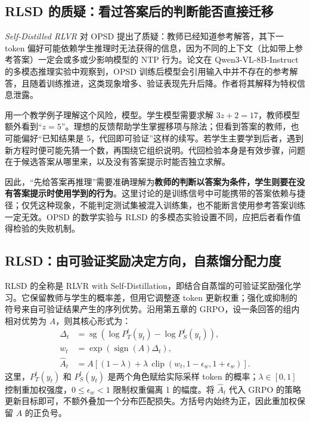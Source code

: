 \subsection{RLSD 的质疑：看过答案后的判断能否直接迁移}

\textit{Self-Distilled RLVR} 对 OPSD 提出了质疑：教师已经知道参考解答，其下一 token 偏好可能依赖学生推理时无法获得的信息，因为不同的上下文（比如带上参考答案）一定会或多或少影响模型的 NTP 行为。论文在 Qwen3-VL-8B-Instruct 的多模态推理实验中观察到，OPSD 训练后模型会引用输入中并不存在的参考解答，且随着训练推进，这类现象增多、验证表现先升后降。作者将其解释为特权信息泄露。

用一个教学例子理解这个风险，模型。学生模型需要求解 $3z+2=17$，教师模型额外看到``$z=5$''。理想的反馈帮助学生掌握移项与除法；但看到答案的教师，也可能偏好``已知结果是 5，代回即可验证''这样的续写。若学生主要学到后者，遇到新方程时便可能先猜一个数，再围绕它组织说明。代回检验本身是有效步骤，问题在于候选答案从哪里来，以及没有答案提示时能否独立求解。

因此，``先给答案再推理''需要准确理解为\textbf{教师的判断以答案为条件，学生则要在没有答案提示时使用学到的行为}。这里讨论的是训练信号中可能携带的答案依赖与捷径；仅凭这种现象，不能判定测试集被混入训练集，也不能断言使用参考答案训练一定无效。OPSD 的数学实验与 RLSD 的多模态实验设置不同，应把后者看作值得检验的失败机制。

\subsection{RLSD：由可验证奖励决定方向，自蒸馏分配力度}

RLSD 的全称是 RLVR with Self-Distillation，即结合自蒸馏的可验证奖励强化学习。它保留教师与学生的概率差，但用它调整逐 token 更新权重；强化或抑制的符号来自可验证结果产生的序列优势。沿用第五章的 GRPO，设一条回答的组内相对优势为 $A$，则其核心形式为：
\[
\begin{aligned}
\Delta_t&=\operatorname{sg}\!\left(\log P_T^t(y_t)-\log P_S^t(y_t)\right),\\
w_t&=\exp\!\left(\operatorname{sign}(A)\Delta_t\right),\\
\widehat A_t&=A\left[(1-\lambda)+\lambda\,
\operatorname{clip}(w_t,1-\epsilon_w,1+\epsilon_w)\right].
\end{aligned}
\]
这里，$P_T^t(y_t)$ 和 $P_S^t(y_t)$ 是两个角色赋给实际采样 token 的概率；$\lambda\in[0,1]$ 控制重加权强度，$0\leq\epsilon_w<1$ 限制权重偏离 1 的幅度。将 $\widehat A_t$ 代入 GRPO 的策略更新目标即可，不额外叠加一个分布匹配损失。方括号内始终为正，因此重加权保留 $A$ 的正负号。

